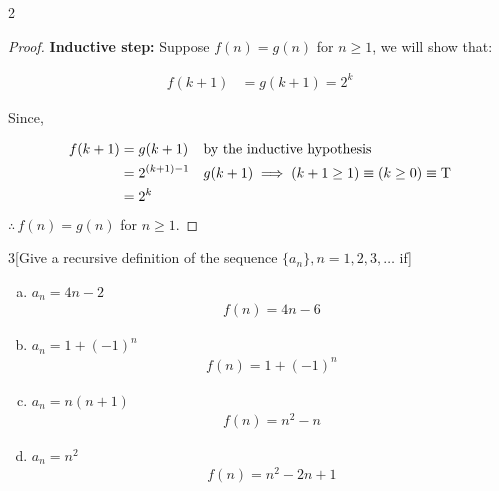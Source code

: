 \documentclass{homework}
\begin{document}
\begin{problem}{2}
\begin{enumerate}[(a)]
\begin{proof}
\textbf{Inductive step:} Suppose $f(n) = g(n)$ for $n \geq 1$, we will show that:

\begin{align*}
f(k + 1) &= g(k + 1) = 2^{k}
\end{align*}

Since,

\begin{align*}
f(k + 1) &= g(k + 1) && \tt{by the inductive hypothesis} \\
&= 2^{(k + 1) -1} && g(k + 1) \implies (k + 1 \geq 1) \equiv (k \geq 0) \equiv \text{T}  \\
&= 2^{k} \\
\end{align*}
$\therefore \, f(n) = g(n)$ for $n \geq 1$.
\end{proof}
\end{enumerate}
\end{problem}



\begin{problem}{3}[Give a recursive definition of the sequence $\{a_n\}, n = 1, 2, 3, \dots$ if]

\begin{enumerate}[(a)]


\item $a_n = 4n - 2$\\
\begin{align*}
f(n) = 4n - 6
\end{align*}


\item $a_n = 1 + (-1)^n$ \\
\begin{align*}
f(n) = 1 + (-1)^n
\end{align*}


\item $a_n = n(n + 1)$ \\
\begin{align*}
f(n) = n^2 - n
\end{align*}


\item $a_n = n^2$ \\
\begin{align*}
f(n) = n^2 - 2n + 1
\end{align*}

\end{enumerate}
\end{problem}
\end{document}
